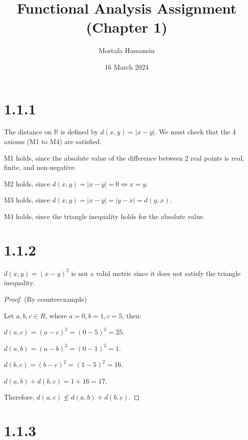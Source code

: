 \documentclass{article}
\author{Mostafa Hassanein}
\title{Functional Analysis Assignment (Chapter 1)}
\date{16 March 2024}
\begin{document}
\maketitle

\newpage

\section*{1.1.1}

The distance on $\mathbb{R}$ is defined by $d(x,y)=|x-y|$. We must check that the 4 axioms (M1 to M4) are satisfied.
\newline

M1 holds, since the absolute value of the difference between 2 real points is real, finite, and non-negative.
\newline

M2 holds, since $d(x,y) = |x-y| = 0 \iff x = y$. 
\newline

M3 holds, since $d(x,y) = |x-y| = |y-x| = d(y,x)$.
\newline

M4 holds, since the triangle inequality holds for the absolute value.


\section*{1.1.2}
$d(x,y) = (x-y)^2$ is not a valid metric since it does not satisfy the triangle inequality.

\begin{proof}{(By counterexample)}
  $ $

  Let $a,b,c \in R$, where $a = 0, b = 1, c = 5$, then:
  \newline
  
  $d(a,c) = (a - c)^2 = (0 - 5)^2 = 25$.

  $d(a,b) = (a - b)^2 = (0 - 1)^2 = 1$.

  $d(b,c) = (b - c)^2 = (1 - 5)^2 = 16$.

  $d(a,b) + d(b,c) = 1 + 16 = 17$.
  \newline

  Therefore, 
  $d(a,c) \not \leq d(a,b) + d(b,c)$.

\end{proof}


\section*{1.1.3}
\end{document}
